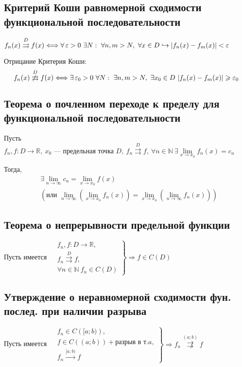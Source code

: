\documentclass[a4paper]{article}
\begin{document}
\subsection{Критерий Коши равномерной сходимости функциональной последовательности}
\theorem $f_n(x)\overset{D}{\rightrightarrows} f(x)\Longleftrightarrow\forall\ve>0\ \exists N:\ \forall n,m>N,\ \forall x\in D\hookrightarrow |f_n(x)-f_m(x)|<\ve$

\comment Отрицание Критерия Коши: 
\begin{equation*}
    f_n(x)\not\overset{D}{\rightrightarrows} f(x)\Longleftrightarrow\exists\ve_0>0\ \forall N:\ \exists n,m>N,\ \exists x_0\in D\ |f_n(x)-f_m(x)|\geqslant\ve_0
\end{equation*}

\subsection{Теорема о почленном переходе к пределу для функциональной последовательности}
\theorem Пусть $f_n,f: D\longrightarrow\mathbb{R},\ x_0\text{ — предельная точка } D,\ f_n\overset{D}{\rightrightarrows} f,\ \forall n\in\mathbb{N}\ \exists\lim\limits_{x\to x_0} f_n(x)=c_n$

Тогда,
\begin{equation*}
    \begin{aligned}
        &\exists\lim\limits_{n\to\infty} c_n=\lim\limits_{x\to x_0} f(x)\\
        &\left(\text{или }\lim\limits_{n\to\infty} \left(\lim_{x\to x_0} f_n(x)\right)=\lim_{x\to x_0}\left(\lim_{n\to\infty} f_n(x)\right)\right)
    \end{aligned}
\end{equation*}

\subsection{Теорема о непрерывности предельной функции}
\theorem Пусть имеется $\left.\begin{aligned}
    &f_n,f: D\longrightarrow\mathbb{R},\\
    &f_n\overset{D}{\rightrightarrows} f,\\
    &\forall n\in\mathbb{N}\ f_n\in C(D)
\end{aligned}\right\}\Longrightarrow f\in C(D)$

\subsection{Утверждение о неравномерной сходимости фун. послед. при наличии разрыва}
\theorem Пусть имеется $\left.\begin{aligned}
    &f_n\in C\left([a;b)\right),\\
    &f\in C((a;b))+\text{разрыв в т.}a,\\
    &f_n\overset{[a;b)}{\longrightarrow} f
\end{aligned}\right\}\Longrightarrow f_n\overset{(a;b)}{\not\rightrightarrows} f$
\end{document}
